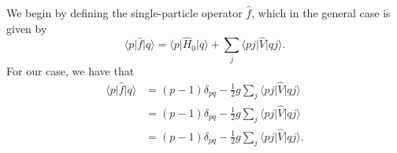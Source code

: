 We begin by defining the single-particle operator $\hat{f}$, which in the general case is given by
\begin{equation*}
    \langle p \vert \hat{f} \vert q \rangle = \langle p \vert \hat{H}_0 \vert q \rangle + \sum_{j} \langle p j \vert \hat{V} \vert q j \rangle.
\end{equation*}
For our case, we have that
\begin{align*}
    \langle p \vert \hat{f} \vert q \rangle &= (p-1) \delta_{pq} - \frac{1}{2} g \sum_{j} \langle p j \vert \hat{V} \vert q j \rangle \\
    &= (p-1) \delta_{pq} - \frac{1}{2} g \sum_{j} \langle p j \vert \hat{V} \vert q j \rangle \\
    &= (p-1) \delta_{pq} - \frac{1}{2} g \sum_{j} \langle p j \vert \hat{V} \vert q j \rangle.
\end{align*}

